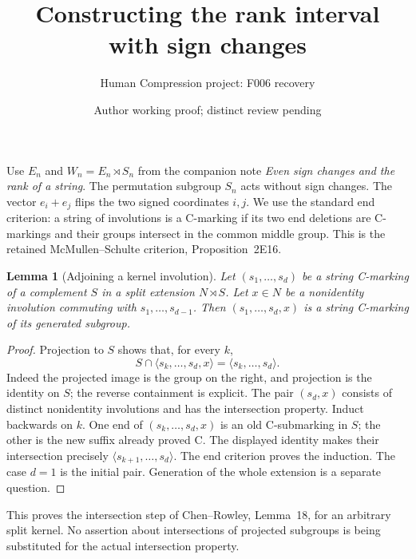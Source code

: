\documentclass[11pt,a4paper]{article}
\title{Constructing the rank interval with sign changes}
\author{Human Compression project: F006 recovery}
\date{Author working proof; distinct review pending}
\newtheorem{lemma}{Lemma}
\newcommand{\gen}[1]{\langle#1\rangle}
\begin{document}
\maketitle
Use $E_n$ and $W_n=E_n\rtimes S_n$ from the companion note
\emph{Even sign changes and the rank of a string}. The permutation
subgroup $S_n$ acts without sign changes. The vector $e_i+e_j$ flips
the two signed coordinates $i,j$. We use the standard end criterion:
a string of involutions is a C-marking if its two end deletions are
C-markings and their groups intersect in the common middle group.
This is the retained McMullen--Schulte criterion, Proposition~2E16.

\begin{lemma}[Adjoining a kernel involution]\label{kernel}
Let $(s_1,\ldots,s_d)$ be a string C-marking of a complement $S$ in
a split extension $N\rtimes S$. Let $x\in N$ be a nonidentity
involution commuting with $s_1,\ldots,s_{d-1}$. Then
$(s_1,\ldots,s_d,x)$ is a string C-marking of its generated subgroup.
\end{lemma}
\begin{proof}
Projection to $S$ shows that, for every $k$,
\[
 S\cap\gen{s_k,\ldots,s_d,x}=\gen{s_k,\ldots,s_d}.
\]
Indeed the projected image is the group on the right, and projection
is the identity on $S$; the reverse containment is explicit.
The pair $(s_d,x)$ consists of distinct nonidentity involutions and
has the intersection property. Induct backwards on $k$. One end
of $(s_k,\ldots,s_d,x)$ is an old C-submarking in $S$; the other
is the new suffix already proved C. The displayed identity makes
their intersection precisely $\gen{s_{k+1},\ldots,s_d}$.
The end criterion proves the induction. The case $d=1$ is the
initial pair. Generation of the whole extension is a separate question.
\end{proof}
This proves the intersection step of Chen--Rowley, Lemma~18, for an
arbitrary split kernel. No assertion about intersections of projected
subgroups is being substituted for the actual intersection property.
\end{document}
